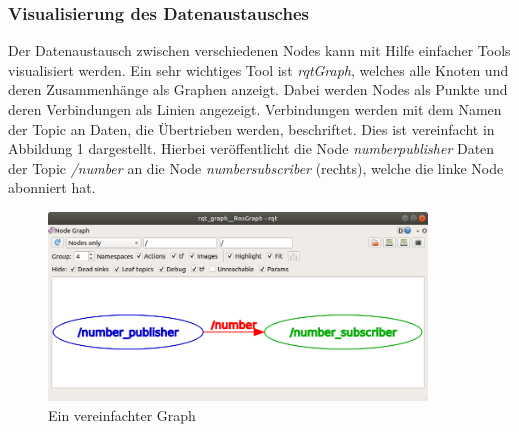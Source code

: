 {{		\subsubsection{Visualisierung des Datenaustausches}
		{
			Der Datenaustausch zwischen verschiedenen Nodes kann mit Hilfe einfacher Tools visualisiert werden. Ein sehr wichtiges Tool ist \textit{rqt\textunderscore Graph}, welches alle Knoten und deren Zusammenhänge als Graphen anzeigt. Dabei werden Nodes als Punkte und deren Verbindungen als Linien angezeigt. Verbindungen werden mit dem Namen der Topic an Daten, die Übertrieben werden, beschriftet. Dies ist vereinfacht in Abbildung 1 dargestellt. Hierbei veröffentlicht die Node \textit{number\textunderscore publisher} Daten der Topic \textit{/number} an die Node \textit{number\textunderscore subscriber} (rechts), welche die linke Node abonniert hat.
			
			\begin{figure}
				\centering
				\includegraphics[height=5cm]{Bilder/rqt_graph_simplified.png}
				\caption{Ein vereinfachter Graph \\
					\parencite{rqtgraphsimplified1}} 
				\label{pic:rqt_graph_simplified}
			\end{figure}
		}
		
}}

